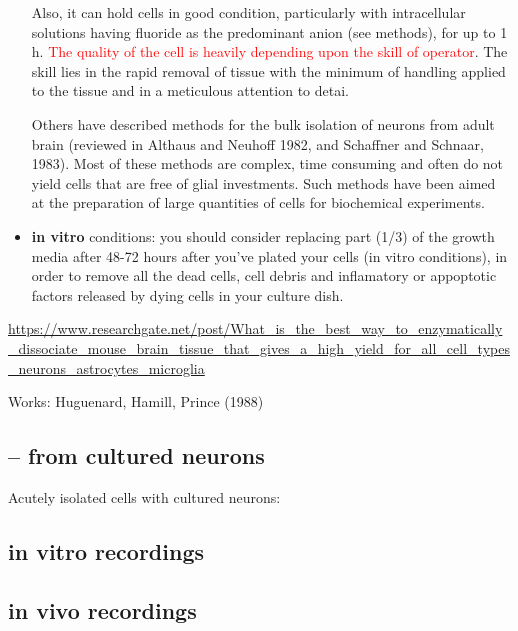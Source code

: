 \begin{itemize}
\begin{itemize}
\end{itemize}

Also, it can hold cells in good condition, particularly with intracellular
solutions having fluoride as the predominant anion (see methods), for up to 1 h.
\textcolor{red}{The quality of the cell is heavily depending upon the skill of
operator}. The skill lies in the rapid removal of tissue with the minimum of
handling applied to the tissue and in a meticulous attention to detai.

\begin{mdframed}
Others have described methods for the bulk isolation of neurons from adult brain
(reviewed in Althaus and Neuhoff 1982, and Schaffner and Schnaar, 1983).
Most of these methods are complex, time consuming and often  do not yield cells
that are free of glial investments.
Such methods have been aimed at   the preparation of large quantities of cells
for biochemical experiments.
\end{mdframed}

  \item {\bf in vitro} conditions: you should consider replacing part (1/3) of
  the growth media after 48-72 hours after you've plated your cells (in vitro
  conditions),  in order to remove all the dead cells, cell debris and
  inflamatory or appoptotic factors released by dying cells in your culture
  dish.


\end{itemize}
\url{https://www.researchgate.net/post/What_is_the_best_way_to_enzymatically_dissociate_mouse_brain_tissue_that_gives_a_high_yield_for_all_cell_types_neurons_astrocytes_microglia}



Works: Huguenard, Hamill, Prince (1988)

\subsection{-- from cultured neurons}

Acutely isolated cells with cultured neurons:

\subsection{in vitro recordings}


\subsection{in vivo recordings}

